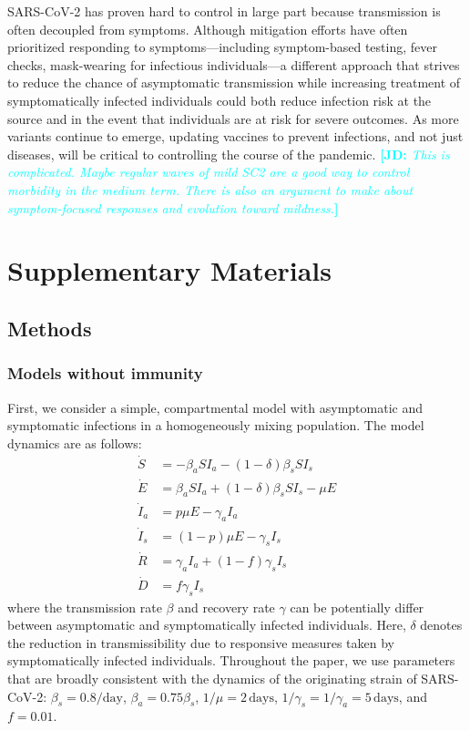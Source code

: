 \documentclass[12pt]{article}
\newcommand{\comment}{\showcomment}
\newcommand{\showcomment}[3]{\textcolor{#1}{\textbf{[#2: }\textsl{#3}\textbf{]}}}
\newcommand{\jd}[1]{\comment{cyan}{JD}{#1}}
\begin{document}
SARS-CoV-2 has proven hard to control in large part because transmission is often decoupled from symptoms. 
Although mitigation efforts have often prioritized responding to symptoms---including symptom-based testing, fever checks, mask-wearing for infectious individuals---a different approach that strives to reduce the chance of asymptomatic transmission while increasing treatment of symptomatically infected individuals could both reduce infection risk at the source and in the event that individuals are at risk for severe outcomes.
As more variants continue to emerge, updating vaccines to prevent infections, and not just diseases, will be critical to controlling the course of the pandemic.
\jd{This is complicated. Maybe regular waves of mild SC2 are a good way to control morbidity in the medium term. There is also an argument to make about symptom-focused responses and evolution toward mildness.}

\pagebreak

\section*{Supplementary Materials}
\setcounter{figure}{0}
\renewcommand{\thefigure}{S\arabic{figure}}

\subsection*{Methods}

\subsubsection*{Models without immunity}

First, we consider a simple, compartmental model with asymptomatic and symptomatic infections in a homogeneously mixing population.
The model dynamics are as follows:
\begin{align}
\dot{S} &= -\beta_a S I_a -(1-\delta) \beta_s S I_s \\
\dot{E} &= \beta_a S I_a + (1-\delta) \beta_s S I_s - \mu E\\
\dot{I}_a &= p \mu E - \gamma_a I_a\\
\dot{I}_s &= (1-p) \mu E -\gamma_s I_s\\
\dot{R} &= \gamma_a I_a + (1-f) \gamma_s I_s \\
\dot{D} &= f \gamma_s I_s
\end{align}
where the transmission rate $\beta$ and recovery rate $\gamma$ can be potentially differ between asymptomatic and symptomatically infected individuals.  
Here, $\delta$ denotes the reduction in transmissibility due to responsive measures taken by symptomatically infected individuals.
Throughout the paper, we use parameters that are broadly consistent with the dynamics of the originating strain of SARS-CoV-2: $\beta_s = 0.8/\mathrm{day}$, $\beta_a = 0.75 \beta_s$, $1/\mu=2\,\mathrm{days}$, $1/\gamma_s=1/\gamma_a=5\,\mathrm{days}$, and $f=0.01$.
\end{document}
